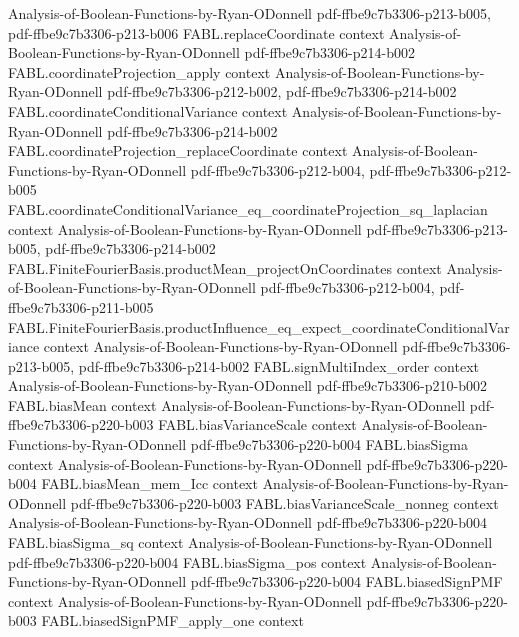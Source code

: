 \begin{theorem}
  {Analysis-of-Boolean-Functions-by-Ryan-ODonnell}
  {pdf-ffbe9c7b3306-p213-b005,
    pdf-ffbe9c7b3306-p213-b006}
\proofstep
  {FABL.replaceCoordinate}
  {context}
  {Analysis-of-Boolean-Functions-by-Ryan-ODonnell}
  {pdf-ffbe9c7b3306-p214-b002}
\proofstep
  {FABL.coordinateProjection_apply}
  {context}
  {Analysis-of-Boolean-Functions-by-Ryan-ODonnell}
  {pdf-ffbe9c7b3306-p212-b002,
    pdf-ffbe9c7b3306-p214-b002}
\proofstep
  {FABL.coordinateConditionalVariance}
  {context}
  {Analysis-of-Boolean-Functions-by-Ryan-ODonnell}
  {pdf-ffbe9c7b3306-p214-b002}
\proofstep
  {FABL.coordinateProjection_replaceCoordinate}
  {context}
  {Analysis-of-Boolean-Functions-by-Ryan-ODonnell}
  {pdf-ffbe9c7b3306-p212-b004,
    pdf-ffbe9c7b3306-p212-b005}
\proofstep
  {FABL.coordinateConditionalVariance_eq_coordinateProjection_sq_laplacian}
  {context}
  {Analysis-of-Boolean-Functions-by-Ryan-ODonnell}
  {pdf-ffbe9c7b3306-p213-b005,
    pdf-ffbe9c7b3306-p214-b002}
\proofstep
  {FABL.FiniteFourierBasis.productMean_projectOnCoordinates}
  {context}
  {Analysis-of-Boolean-Functions-by-Ryan-ODonnell}
  {pdf-ffbe9c7b3306-p212-b004,
    pdf-ffbe9c7b3306-p211-b005}
\proofstep
  {FABL.FiniteFourierBasis.productInfluence_eq_expect_coordinateConditionalVariance}
  {context}
  {Analysis-of-Boolean-Functions-by-Ryan-ODonnell}
  {pdf-ffbe9c7b3306-p213-b005,
    pdf-ffbe9c7b3306-p214-b002}
\proofstep
  {FABL.signMultiIndex_order}
  {context}
  {Analysis-of-Boolean-Functions-by-Ryan-ODonnell}
  {pdf-ffbe9c7b3306-p210-b002}
\proofstep
  {FABL.biasMean}
  {context}
  {Analysis-of-Boolean-Functions-by-Ryan-ODonnell}
  {pdf-ffbe9c7b3306-p220-b003}
\proofstep
  {FABL.biasVarianceScale}
  {context}
  {Analysis-of-Boolean-Functions-by-Ryan-ODonnell}
  {pdf-ffbe9c7b3306-p220-b004}
\proofstep
  {FABL.biasSigma}
  {context}
  {Analysis-of-Boolean-Functions-by-Ryan-ODonnell}
  {pdf-ffbe9c7b3306-p220-b004}
\proofstep
  {FABL.biasMean_mem_Icc}
  {context}
  {Analysis-of-Boolean-Functions-by-Ryan-ODonnell}
  {pdf-ffbe9c7b3306-p220-b003}
\proofstep
  {FABL.biasVarianceScale_nonneg}
  {context}
  {Analysis-of-Boolean-Functions-by-Ryan-ODonnell}
  {pdf-ffbe9c7b3306-p220-b004}
\proofstep
  {FABL.biasSigma_sq}
  {context}
  {Analysis-of-Boolean-Functions-by-Ryan-ODonnell}
  {pdf-ffbe9c7b3306-p220-b004}
\proofstep
  {FABL.biasSigma_pos}
  {context}
  {Analysis-of-Boolean-Functions-by-Ryan-ODonnell}
  {pdf-ffbe9c7b3306-p220-b004}
\proofstep
  {FABL.biasedSignPMF}
  {context}
  {Analysis-of-Boolean-Functions-by-Ryan-ODonnell}
  {pdf-ffbe9c7b3306-p220-b003}
\proofstep
  {FABL.biasedSignPMF_apply_one}
  {context}

\end{theorem}
